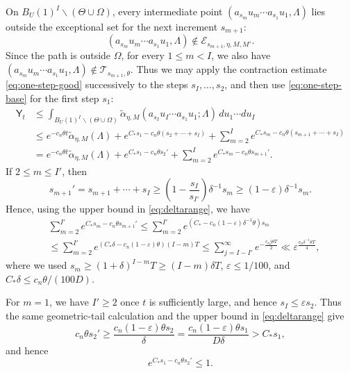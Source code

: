 \documentclass[reqno,11pt]{amsart}
\numberwithin{equation}{section}
\theoremstyle{definition}
\theoremstyle{remark}
\begin{document}
On $B_{U}(1)^I\smallsetminus(\Theta \cup \Omega)$, every intermediate point
$ (a_{s_m}u_m\cdots a_{s_1}u_1,\Lambda) $ lies outside the exceptional set for the next increment $s_{m+1}$:
$$
(a_{s_m}u_m\cdots a_{s_1}u_1,\Lambda)
\notin \mathcal E_{s_{m+1},\eta,M,M'}.
$$
Since the path is outside $\Omega$, for every $1\leq m< I$, we also have $(a_{s_m}u_m\cdots a_{s_1}u_1,\Lambda)\notin \mathcal T_{s_{m+1},\theta}$. Thus we may
apply the contraction estimate \eqref{eq:one-step-good} successively to the
steps $s_I,\dots,s_2$, and then use \eqref{eq:one-step-base}
for the first step $s_1$:
\begin{equation}\label{eq:Goodestimate1}
\begin{aligned}
\mathsf Y_{t}
&\le
\int_{B_{U}(1)^I\smallsetminus (\Theta\cup \Omega)}
\widetilde{\alpha}_{\eta,M}(a_{s_I}u_I\cdots a_{s_1}u_1;\Lambda)
\,du_1\cdots du_I \\
&\le
e^{-c_n\theta t}
\widetilde{\alpha}_{\eta,M}(\Lambda)
+
e^{C_*s_1-c_n\theta(s_2+\cdots+s_I)}  +
\sum_{m=2}^I
e^{C_*s_m
-c_n\theta(s_{m+1}+\cdots+s_I)} \\
&=
e^{-c_n\theta t}
\widetilde{\alpha}_{\eta,M}(\Lambda)
+
e^{C_*s_1-c_n\theta s_2'} +\sum_{m=2}^I
e^{C_*s_m-c_n\theta s_{m+1}'}.
\end{aligned}
\end{equation}
If $2\le m\le I'$, then
$$
s_{m+1}'
=
s_{m+1}+\cdots+s_I
\ge
\left(1-\frac{s_I}{s_{I'}}\right)\delta^{-1}s_m
\ge
(1-\varepsilon)\delta^{-1}s_m.
$$
Hence, using the upper bound in \eqref{eq:deltarange}, we have
\begin{equation}\label{eq:exponentialsum0}
\begin{aligned}
& \sum_{m=2}^{I'}
e^{C_*s_m-c_n\theta s_{m+1}'}
\le
\sum_{m=2}^{I'}
e^{\left(C_*-c_n(1-\varepsilon)\delta^{-1}\theta\right)s_m} \\
&\le
\sum_{m=2}^{I'}
e^{\left(C_*\delta-c_n(1-\varepsilon)\theta\right)(I-m)T}  \le
\sum_{j=I-I'}^\infty e^{-\frac{c_nj\theta T}{2}}
\ll
\varepsilon^{\frac{c_n\delta^{-1}\theta T}{4}},
\end{aligned}
\end{equation}
where we used $s_m\ge(1+\delta)^{I-m}T\ge(I-m)\delta T$,
$\varepsilon\le1/100$, and
$C_*\delta\le c_n\theta/(100D)$.

For $m=1$, we have $I'\ge2$ once $t$ is sufficiently large, and hence
$s_I\le\varepsilon s_2$. Thus the same geometric-tail calculation and
the upper bound in \eqref{eq:deltarange} give
$$
c_n\theta s_2'
\ge
\frac{c_n(1-\varepsilon)\theta s_2}{\delta}
=
\frac{c_n(1-\varepsilon)\theta s_1}{D\delta}
>
C_*s_1,
$$
and hence
\begin{equation}\label{eq:exponentialsum1}
e^{C_*s_1-c_n\theta s_2'}\le 1.
\end{equation}
\end{document}
